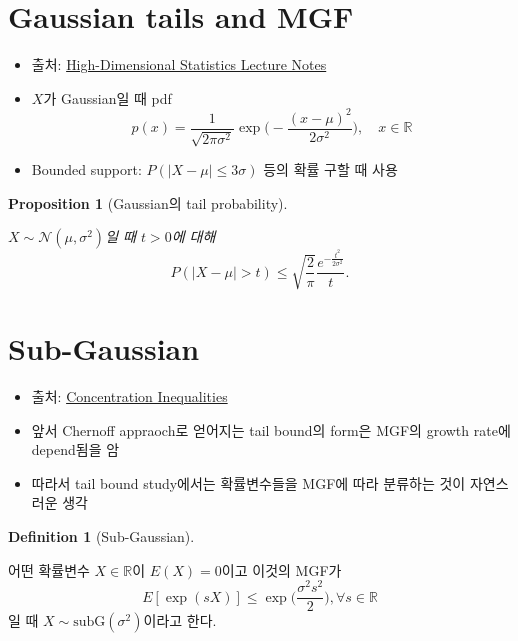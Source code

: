 \documentclass[
  letterpaper,
  DIV=11,
  numbers=noendperiod]{scrreprt}
\theoremstyle{plain}
\theoremstyle{definition}
\theoremstyle{definition}
\newtheorem{definition}{Definition}[chapter]
\theoremstyle{plain}
\newtheorem{proposition}{Proposition}[chapter]
\theoremstyle{plain}
\theoremstyle{remark}
\begin{document}
\section{Gaussian tails and MGF}\label{gaussian-tails-and-mgf}

\begin{itemize}
\item
  출처:
  \href{https://ocw.mit.edu/courses/18-s997-high-dimensional-statistics-spring-2015/a69e2f53bb2eeb9464520f3027fc61e6_MIT18_S997S15_Chapter1.pdf}{High-Dimensional
  Statistics Lecture Notes}
\item
  \(X\)가 Gaussian일 때 pdf \[
  p(x) = \frac{1}{\sqrt{2\pi \sigma^2}} \exp \Big( - \frac{(x-\mu)^2}{2\sigma^2} \Big), \quad{} x \in \mathbb{R}
  \]
\item
  Bounded support: \(P(|X-\mu|\leq 3\sigma)\) 등의 확률 구할 때 사용
\end{itemize}

\begin{proposition}[Gaussian의 tail
probability]\protect\hypertarget{prp-gaussiantail}{}\label{prp-gaussiantail}

\(X\sim \mathcal{N}(\mu, \sigma^2)\)일 때 \(t>0\)에 대해 \[
P(|X-\mu | >t) \leq \sqrt{\frac{2}{\pi}}\frac{e^{-\frac{t^2}{2\sigma^2}}}{t}.
\]

\end{proposition}

\section{Sub-Gaussian}\label{sub-gaussian}

\begin{itemize}
\item
  출처:
  \href{https://gclinderman.github.io/blog/probability/2018/01/07/concentration-inequalities.html}{Concentration
  Inequalities}
\item
  앞서 Chernoff appraoch로 얻어지는 tail bound의 form은 MGF의 growth
  rate에 depend됨을 암
\item
  따라서 tail bound study에서는 확률변수들을 MGF에 따라 분류하는 것이
  자연스러운 생각
\end{itemize}

\begin{definition}[Sub-Gaussian]\protect\hypertarget{def-subgaussian}{}\label{def-subgaussian}

어떤 확률변수 \(X\in \mathbb{R}\)이 \(E(X)=0\)이고 이것의 MGF가 \[
E[\exp (sX)] \leq \exp \Big( \frac{\sigma^2 s^2}{2} \Big), \forall s \in \mathbb{R}
\] 일 때 \(X \sim \text{subG}(\sigma^2)\)이라고 한다.

\end{definition}
\end{document}

